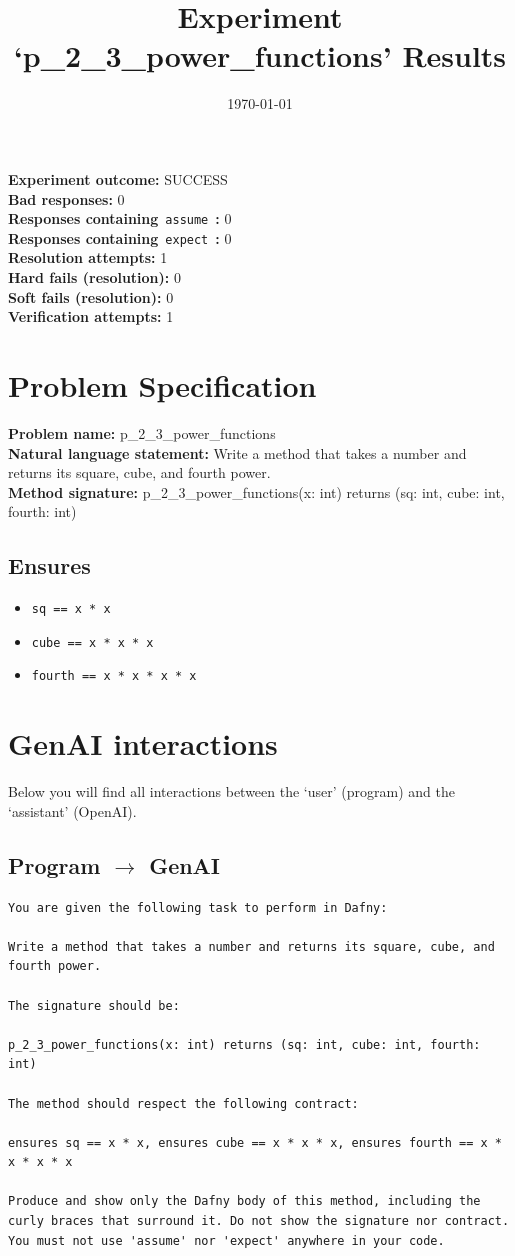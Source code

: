 \documentclass{article}
\begin{document}
\title{Experiment `p\_2\_3\_power\_functions' Results}
\author{\today}
\date{}
\maketitle
\textbf{Experiment outcome: }SUCCESS
\\\textbf{Bad responses: }0
\\\textbf{Responses containing}~\texttt{assume}~\textbf{: }0
\\\textbf{Responses containing}~\texttt{expect}~\textbf{: }0
\\\textbf{Resolution attempts: }1
\\\textbf{Hard fails (resolution): }0
\\\textbf{Soft fails (resolution): }0
\\\textbf{Verification attempts: }1
\section*{Problem Specification}
\textbf{Problem name: }p\_2\_3\_power\_functions
\\\textbf{Natural language statement: }Write a method that takes a number and returns its square, cube, and fourth power.
\\\textbf{Method signature: }p\_2\_3\_power\_functions(x: int) returns (sq: int, cube: int, fourth: int)
\subsection*{Ensures}
\begin{itemize}
\item \texttt{sq == x * x}
\item \texttt{cube == x * x * x}
\item \texttt{fourth == x * x * x * x}
\end{itemize}
\clearpage
\section*{GenAI interactions}
Below you will find all interactions between the `user' (program) and the `assistant' (OpenAI).
\subsection*{Program $\rightarrow$ GenAI}
\begin{lstlisting}
You are given the following task to perform in Dafny:

Write a method that takes a number and returns its square, cube, and fourth power.

The signature should be:

p_2_3_power_functions(x: int) returns (sq: int, cube: int, fourth: int)

The method should respect the following contract:

ensures sq == x * x, ensures cube == x * x * x, ensures fourth == x * x * x * x

Produce and show only the Dafny body of this method, including the curly braces that surround it. Do not show the signature nor contract. You must not use 'assume' nor 'expect' anywhere in your code.
\end{lstlisting}
\end{document}

